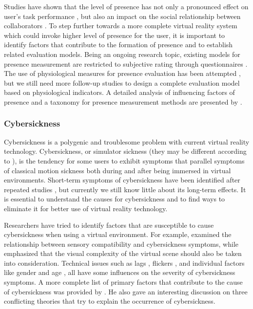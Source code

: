 Studies have shown that the level of presence has not only a pronounced effect on user's task performance \citep{Dangelo2008Benefits}, but also an impact on the social relationship between collaborators \citep{Slater2000Small}. To step further towards a more complete virtual reality system which could invoke higher level of presence for the user, it is important to identify factors that contribute to the formation of presence and to establish related evaluation models. Being an ongoing research topic, existing models for presence measurement are restricted to subjective rating through questionnaires \citep{Usoh2000Using, Witmer1998MPV}. The use of physiological measures for presence evaluation has been attempted \citep{Meehan2002Physiological}, but we still need more follow-up studies to design a complete evaluation model based on physiological indicators. A detailed analysis of influencing factors of presence and a taxonomy for presence measurement methods are presented by \citet{Schuemie2001Pres}.


\subsubsection{Cybersickness}
Cybersickness is a polygenic \citep{Kennedy1992Simulator} and troublesome problem with current virtual reality technology. Cybersickness, or simulator sickness (they may be different according to \citet{Stanney1997Cybersickness}), is the tendency for some users to exhibit symptoms that parallel symptoms of classical motion sickness both during and after being immersed in virtual environments. Short-term symptoms of cybersickness have been identified after repeated studies \citep{Lawson2002Signs}, but currently we still know little about its long-term effects. It is essential to understand the causes for cybersickness and to find ways to eliminate it for better use of virtual reality technology.

Researchers have tried to identify factors that are susceptible to cause cybersickness when using a virtual environment. For example, \citet{Rich1996AICS} examined the relationship between sensory compatibility and cybersickness symptoms, while \citet{So2002Scene} emphasized that the visual complexity of the virtual scene should also be taken into consideration. Technical issues such as lags \citep{Pausch1992Literature}, flickers \citep{Harwood1987Temporal}, and individual factors like gender \citep{Biocca1992Will} and age \citep{Reason1975Motion}, all have some influences on the severity of cybersickness symptoms. A more complete list of primary factors that contribute to the cause of cybersickness was provided by \citet{LaViola2000DCV}. He also gave an interesting discussion on three conflicting theories that try to explain the occurrence of cybersickness.

